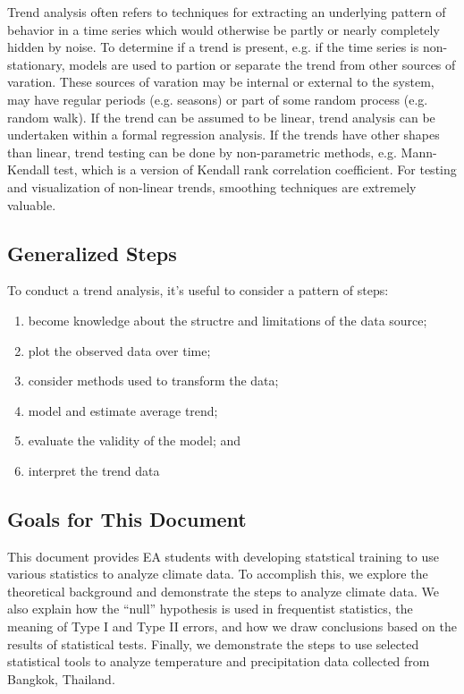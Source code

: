 \documentclass{article}\usepackage[]{graphicx}\usepackage[]{color}
\begin{document}
Trend analysis often refers to techniques for extracting an underlying pattern of behavior in a time series which would otherwise be partly or nearly completely hidden by noise. To determine if a trend is present, e.g. if the time series is non-stationary, models are used to partion or separate the trend from other sources of varation.
These sources of varation may be internal or external to the system, may have regular periods (e.g. seasons) or part of some random process (e.g. random walk). If the trend can be assumed to be linear, trend analysis can be undertaken within a formal regression analysis. If the trends have other shapes than linear, trend testing can be done by non-parametric methods, e.g. Mann-Kendall test, which is a version of Kendall rank correlation coefficient. For testing and visualization of non-linear trends, smoothing techniques are extremely valuable. 

\subsection{Generalized Steps}

To conduct a trend analysis, it's useful to consider a pattern of steps:

\begin{enumerate}
  \item become knowledge about the structre and limitations of the data source;
  \item plot the observed data over time;
  \item consider methods used to transform the data; 
  \item model and estimate average trend;
  \item evaluate the validity of the model; and
  \item interpret the trend data
\end{enumerate}

\subsection{Goals for This Document}

This document provides EA students with developing statstical training to use various statistics to analyze climate data. To accomplish this, we explore the theoretical background and demonstrate the steps to analyze climate data. We also explain how the ``null'' hypothesis is used in frequentist statistics, the meaning of Type I and Type II errors, and how we draw conclusions based on the results of statistical tests. Finally, we demonstrate the steps to use selected statistical tools to analyze temperature and precipitation data collected from Bangkok, Thailand. 
\end{document}
